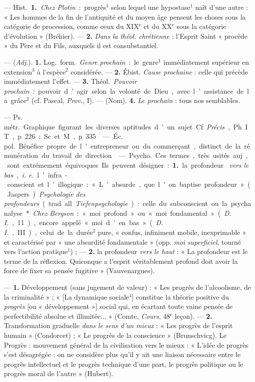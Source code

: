 \begin{itemize}[leftmargin=1cm, label=, itemsep=1pt]
 — \si{Hist.} {\bf 1.} {\it Chez Plotin} : progrès$^1$ selon
lequel une hypostase$^1$ naît d’une autre : « Les hommes de la fin de
l'antiquité et du moyen âge pensent les choses sous la catégorie
de procession, comme ceux du {\footnotesize XIX}$^\text{e}$ et du
{\footnotesize XX}$^\text{e}$ sous la catégorie d'évolution » (Bréhier). —
{\bf 2.} {\it Dans la théol. chrétienne} : l'Esprit Saint « procède » du
Père et du Fils, auxquels il est consubstantiel.

 — ({\it Adj.}). {\bf 1.} \si{Log.} \si{form.} {\it Genre
prochain} : le genre$^1$ immédiatement supérieur en extension$^3$ à
l'espèce$^2$ considérée. — {\bf 2.} Ébist. {\it Cause prochaine} : celle qui
précède immédiatement l'effet. — {\bf 3.} \si{Théol.} {\it Pouvoir
prochain} : pouvoir d’agir selon la volonté de Dieu, avec l’assistance de la
grâce$^2$ (cf. Pascal, {\it Prov.}, I). — (Nom). {\bf 4.} {\it Le
prochain} : tous nos semblables.


 — \si{Ps. métr.} Graphique figurant les diverses
aptitudes d’un sujet. Cf. {\it Précis}, Ph. IT, p. 226 ; Sc. et M., p. 335.

 — \si{Éc. pol.} Bénéfice propre de l'entrepreneur ou du
commerçant, distinct de la rémunération du travail de direction.

 — \si{Psycho.} Ces termes, très usités auj., sont
extrémement équivoques. Ils peuvent désigner : {\bf 1.} la profondeur {\it
vers le bas}, {\it i. e.} l’infra-conscient et l'illogique : « L’absurde,
que l’on baptise profondeur » (Jaspers). {\it Psychologie des profondeurs}
(trad. all. {\it Tiefenpsychologie}) : celle du subconscient ou la
psychanalyse*. {\it Chez Bergson} : « moi profond » ou « moi fondamental
» ({\it D. I.}, 11), encore appelé « moi d’en bas » ({\it D. I.}, III),
celui de la durée$^2$ pure, « confus, infiniment mobile, inexprimable » et
caractérisé par « une absurdité fondamentale » (opp. {\it moi superficiel},
tourné vers l’action pratique$^1$) ; — {\bf 2.} la profondeur {\it vers le
haut} : « La profondeur est le terme de la réflexion. Quiconque a l'esprit
véritablement
profond doit avoir la force de fixer sa pensée fugitive » (Vauvenargues).

 —  {\bf 1.} Développement (sans jugement de
valeur) : « Les progrès de l'alcoolisme, de la criminalité » ; « [La
dynamique sociale$^4$] constitue la théorie positive du {\it progrès} [ou «
développement »] social qui, en écartant toute vaine pensée de
perfectibilité absolue et illimitée... » (Comte, {\it Cours}, 48$^\text{e}$
leçon). —  {\bf 2.} Transformation graduelle {\it dans le
sens d'un mieux} : « Les progrès de l'esprit humain » (Condorcet) ; « Le
progrès de la conscience » (Brunschvicg). Le Progrès : mouvement général de
la civilisation vers le mieux : « L'idée de progrès s’est désagrégée : on ne
considère plus qu'il y ait une liaison nécessaire entre le progrès
intellectuel et le progrès technique d'une part, le progrès politique ou le
progrès moral de l’autre » (Hubert).


\end{itemize}
